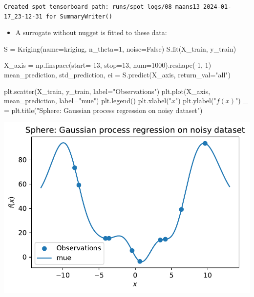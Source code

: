 \documentclass[
  letterpaper,
  DIV=11,
  numbers=noendperiod]{scrreprt}
\newenvironment{Shaded}{\begin{snugshade}}{\end{snugshade}}
\newcommand{\DecValTok}[1]{\textcolor[rgb]{0.68,0.00,0.00}{#1}}
\newcommand{\NormalTok}[1]{\textcolor[rgb]{0.00,0.23,0.31}{#1}}
\newcommand{\OperatorTok}[1]{\textcolor[rgb]{0.37,0.37,0.37}{#1}}
\newcommand{\StringTok}[1]{\textcolor[rgb]{0.13,0.47,0.30}{#1}}
\newcommand{\VariableTok}[1]{\textcolor[rgb]{0.07,0.07,0.07}{#1}}
\providecommand{\tightlist}{%
  \setlength{\itemsep}{0pt}\setlength{\parskip}{0pt}}\usepackage{longtable,booktabs,array}
\begin{document}
\begin{verbatim}
Created spot_tensorboard_path: runs/spot_logs/08_maans13_2024-01-17_23-12-31 for SummaryWriter()
\end{verbatim}

\begin{itemize}
\tightlist
\item
  A surrogate without nugget is fitted to these data:
\end{itemize}

\begin{Shaded}
\begin{Highlighting}[]
\NormalTok{S }\OperatorTok{=}\NormalTok{ Kriging(name}\OperatorTok{=}\StringTok{\textquotesingle{}kriging\textquotesingle{}}\NormalTok{,}
\NormalTok{            n\_theta}\OperatorTok{=}\DecValTok{1}\NormalTok{,}
\NormalTok{            noise}\OperatorTok{=}\VariableTok{False}\NormalTok{)}
\NormalTok{S.fit(X\_train, y\_train)}

\NormalTok{X\_axis }\OperatorTok{=}\NormalTok{ np.linspace(start}\OperatorTok{={-}}\DecValTok{13}\NormalTok{, stop}\OperatorTok{=}\DecValTok{13}\NormalTok{, num}\OperatorTok{=}\DecValTok{1000}\NormalTok{).reshape(}\OperatorTok{{-}}\DecValTok{1}\NormalTok{, }\DecValTok{1}\NormalTok{)}
\NormalTok{mean\_prediction, std\_prediction, ei }\OperatorTok{=}\NormalTok{ S.predict(X\_axis, return\_val}\OperatorTok{=}\StringTok{"all"}\NormalTok{)}

\NormalTok{plt.scatter(X\_train, y\_train, label}\OperatorTok{=}\StringTok{"Observations"}\NormalTok{)}
\NormalTok{plt.plot(X\_axis, mean\_prediction, label}\OperatorTok{=}\StringTok{"mue"}\NormalTok{)}
\NormalTok{plt.legend()}
\NormalTok{plt.xlabel(}\StringTok{"$x$"}\NormalTok{)}
\NormalTok{plt.ylabel(}\StringTok{"$f(x)$"}\NormalTok{)}
\NormalTok{\_ }\OperatorTok{=}\NormalTok{ plt.title(}\StringTok{"Sphere: Gaussian process regression on noisy dataset"}\NormalTok{)}
\end{Highlighting}
\end{Shaded}

\includegraphics{013_num_spot_noisy_files/figure-pdf/cell-14-output-1.pdf}
\end{document}
